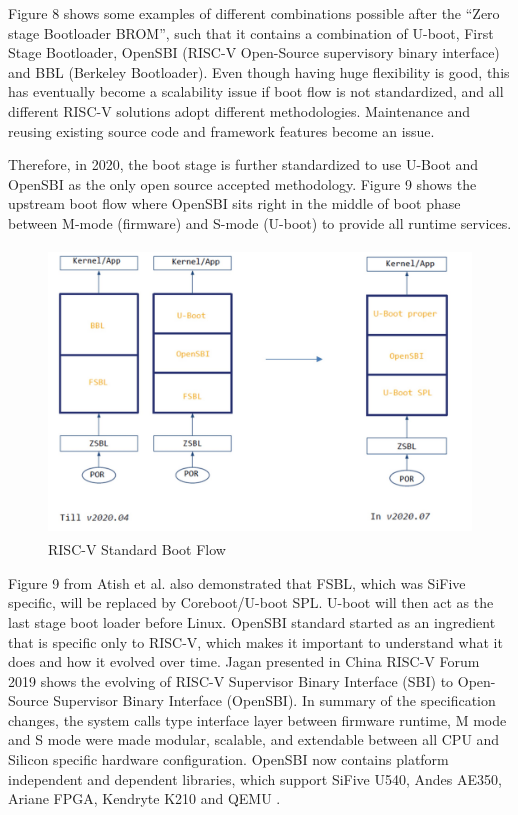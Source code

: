 \documentclass[review]{elsarticle}
\begin{document}
Figure 8 shows some examples of different combinations possible after the “Zero stage Bootloader BROM”, such that it contains a combination of U-boot, First Stage Bootloader, OpenSBI (RISC-V Open-Source supervisory binary interface) and BBL (Berkeley Bootloader). Even though having huge flexibility is good, this has eventually become a scalability issue if boot flow is not standardized, and all different RISC-V solutions adopt different methodologies. Maintenance and reusing existing source code and framework features become an issue.

Therefore, in 2020, the boot stage is further standardized to use U-Boot and OpenSBI as the only open source accepted methodology. Figure 9 shows the upstream boot flow where OpenSBI sits right in the middle of boot phase between M-mode (firmware) and S-mode (U-boot) to provide all runtime services.

\begin{figure}[H]
	\centering
	\includegraphics[width=1\textwidth,height=3in]{figs/RiscVStandardBootFlow.JPG}
	\caption{RISC-V Standard Boot Flow \cite{R51:1}}
\end{figure}

Figure 9 from Atish et al. also demonstrated that FSBL, which was SiFive specific, will be replaced by Coreboot/U-boot SPL. U-boot will then act as the last stage boot loader before Linux. OpenSBI standard started as an ingredient that is specific only to RISC-V, which makes it important to understand what it does and how it evolved over time. Jagan presented in China RISC-V Forum 2019 shows the evolving of RISC-V Supervisor Binary Interface (SBI) to Open-Source Supervisor Binary Interface (OpenSBI). In summary of the specification changes, the system calls type interface layer between firmware runtime, M mode and S mode were made modular, scalable, and extendable between all CPU and Silicon specific hardware configuration. OpenSBI now contains platform independent and dependent libraries, which support SiFive U540, Andes AE350, Ariane FPGA, Kendryte K210 and QEMU \cite{R51:1}.
\end{document}
